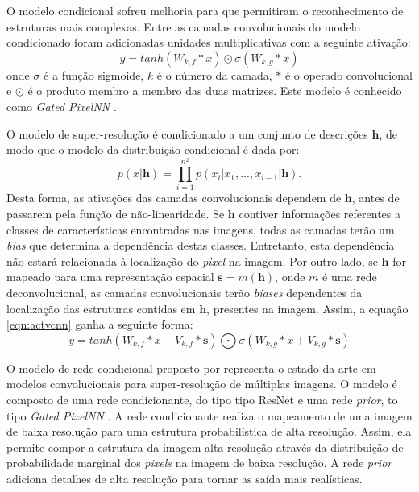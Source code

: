 O modelo condicional sofreu melhoria para que permitiram o reconhecimento de estruturas mais complexas.
Entre as camadas convolucionais do modelo condicionado foram adicionadas unidades
multiplicativas com a seguinte ativação:
\begin{equation}
\label{eqn:actvcnn}
y = tanh(W_{k,f} * x)\odot \sigma(W_{k,g}*x)
\end{equation}
onde $\sigma$ é a função sigmoide, $k$ é o número da camada, $*$ é o operado
convolucional e $\odot$ é o produto membro a membro das duas matrizes. Este modelo é
conhecido como \textit{Gated PixelNN} \citep{Oord16}.

O modelo de super-resolução é condicionado a um conjunto de
descrições $\boldsymbol{h}$, de modo que o modelo da distribuição condicional é dada
por:
\begin{equation}
\label{eqn:prodcnncond}
p(x|\boldsymbol{h}) = \prod_{i=1}^{n^2}p(x_i|x_1,...,x_{i-1}|\boldsymbol{h}).
\end{equation}
Desta forma, as ativações das camadas convolucionais dependem de $\boldsymbol{h}$,
antes de passarem pela função de não-linearidade. Se $\boldsymbol{h}$ contiver
informações referentes a classes de características encontradas nas imagens, todas as camadas terão um \textit{bias} que determina
a dependência destas classes. Entretanto, esta dependência não estará relacionada à
localização do \textit{pixel} na imagem. Por outro lado, se $\boldsymbol{h}$ for mapeado
para uma representação espacial $\boldsymbol{s}=m(\boldsymbol{h})$, onde $m$ é uma rede
deconvolucional, as camadas convolucionais terão \textit{biases} dependentes da localização
das estruturas contidas em $\boldsymbol{h}$, presentes na imagem. Assim, a equação \ref{eqn:actvcnn}
ganha a seguinte forma:
\begin{equation}
\label{eqn:actvcnncond}
y = tanh(W_{k,f} * x + V_{k,f}*\boldsymbol{s})\bigodot \sigma(W_{k,g}*x + V_{k,g}*\boldsymbol{s})
\end{equation}

O modelo de rede condicional proposto por \cite{DahlNS17} representa o estado da arte em modelos convolucionais para
super-resolução de múltiplas imagens. O modelo é composto de uma rede condicionante, do tipo tipo ResNet \citep{He2016}
e uma rede \textit{prior}, to tipo \textit{Gated PixelNN} \citep{Oord16}.
A rede condicionante realiza o mapeamento de uma imagem de baixa resolução para uma estrutura probabilística
de alta resolução. Assim, ela permite compor a estrutura da imagem alta resolução através da distribuição
de probabilidade marginal dos \textit{pixels} na imagem de baixa resolução. A rede \textit{prior} adiciona detalhes de alta resolução
para tornar as saída mais realísticas. 

